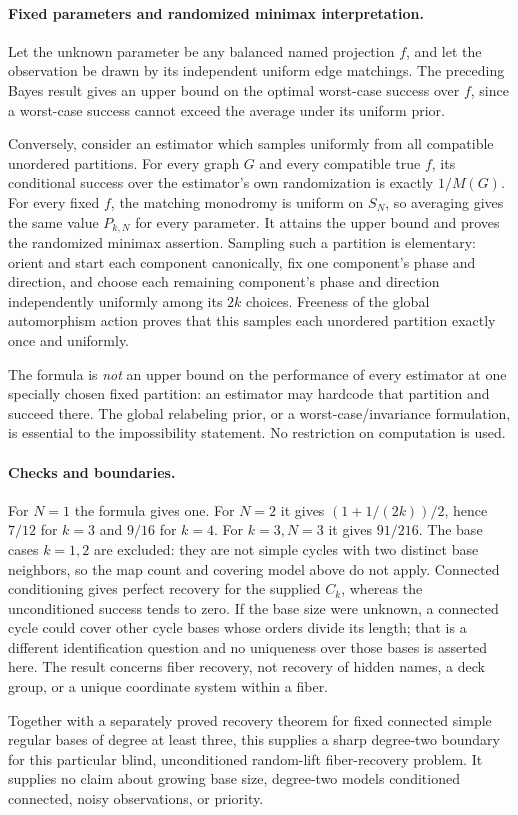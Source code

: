 \documentclass[11pt]{article}
\begin{document}
\paragraph{Fixed parameters and randomized minimax interpretation.}
Let the unknown parameter be any balanced named projection $f$, and let
the observation be drawn by its independent uniform edge matchings.
The preceding Bayes result gives an upper bound on the optimal worst-case
success over $f$, since a worst-case success cannot exceed the average
under its uniform prior.

Conversely, consider an estimator which samples uniformly from all
compatible unordered partitions. For every graph $G$ and every compatible
true $f$, its conditional success over the estimator's own randomization
is exactly $1/M(G)$. For every fixed $f$, the matching monodromy is uniform
on $S_N$, so averaging gives the same value $P_{k,N}$ for every parameter.
It attains the upper bound and proves the randomized minimax assertion.
Sampling such a partition is elementary: orient and start each component
canonically, fix one component's phase and direction, and choose each
remaining component's phase and direction independently uniformly among
its $2k$ choices. Freeness of the global automorphism action proves that
this samples each unordered partition exactly once and uniformly.

The formula is \emph{not} an upper bound on the performance of every
estimator at one specially chosen fixed partition: an estimator may
hardcode that partition and succeed there. The global relabeling prior,
or a worst-case/invariance formulation, is essential to the impossibility
statement. No restriction on computation is used.

\paragraph{Checks and boundaries.}
For $N=1$ the formula gives one. For $N=2$ it gives
$(1+1/(2k))/2$, hence $7/12$ for $k=3$ and $9/16$ for $k=4$.
For $k=3,N=3$ it gives $91/216$. The base cases $k=1,2$ are excluded:
they are not simple cycles with two distinct base neighbors, so the map
count and covering model above do not apply. Connected conditioning gives
perfect recovery for the supplied $C_k$, whereas the unconditioned
success tends to zero. If the base size were unknown, a connected cycle
could cover other cycle bases whose orders divide its length; that is a
different identification question and no uniqueness over those bases
is asserted here.
The result concerns fiber recovery, not recovery of hidden names, a deck
group, or a unique coordinate system within a fiber.

Together with a separately proved recovery theorem for fixed connected
simple regular bases of degree at least three, this supplies a sharp
degree-two boundary for this particular blind, unconditioned random-lift
fiber-recovery problem. It supplies no claim about growing base size,
degree-two models conditioned connected, noisy observations, or priority.
\end{document}
